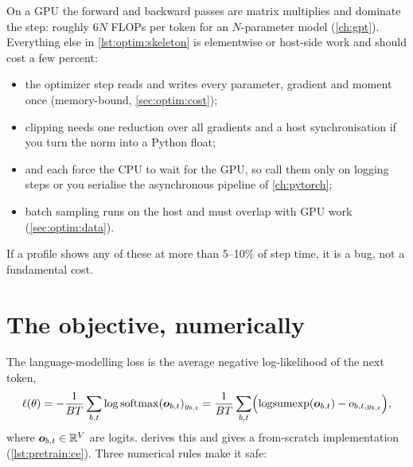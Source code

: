 \begin{systemslens}
On a GPU the forward and backward passes are matrix multiplies and dominate the step: roughly
$6N$ FLOPs per token for an $N$-parameter model (\cref{ch:gpt}). Everything else in
\cref{lst:optim:skeleton} is elementwise or host-side work and should cost a few percent:
\begin{itemize}
  \item the optimizer step reads and writes every parameter, gradient and moment once
        (memory-bound, \cref{sec:optim:cost});
  \item clipping needs one reduction over all gradients and a host synchronisation if you turn
        the norm into a Python float;
  \item {} and  each force the CPU to wait for the GPU, so call
        them only on logging steps or you serialise the asynchronous pipeline of \cref{ch:pytorch};
  \item batch sampling runs on the host and must overlap with GPU work (\cref{sec:optim:data}).
\end{itemize}
If a profile shows any of these at more than 5--10\% of step time, it is a bug, not a
fundamental cost.
\end{systemslens}

\section{The objective, numerically}\label{sec:optim:loss}

The language-modelling loss is the average negative log-likelihood of the next token,
\begin{equation}
\ell(\theta) = -\frac{1}{BT}\sum_{b,t}\log \operatorname{softmax}(\bm{o}_{b,t})_{y_{b,t}}
= \frac{1}{BT}\sum_{b,t}\Bigl(\operatorname{logsumexp}(\bm{o}_{b,t}) - o_{b,t,y_{b,t}}\Bigr),
\label{eq:optim:ce}
\end{equation}
where $\bm{o}_{b,t}\in\mathbb{R}^{V}$ are logits.  derives this and gives a
from-scratch implementation (\cref{lst:pretrain:ce}). Three numerical rules make it safe:

